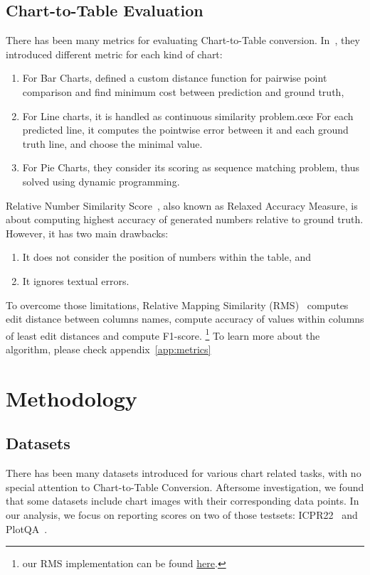 \documentclass[
	letterpaper, %
]{jdf}
\begin{document}
\subsection{Chart-to-Table Evaluation}\label{ssect:task-evaluation}
There has been many metrics for evaluating Chart-to-Table conversion.
In~\cite{luo2021chartocr}, they introduced different metric for each kind of chart:
\begin{enumerate}
         \item For Bar Charts, defined a custom distance function for pairwise point comparison and find minimum cost between prediction and ground truth,
         \item For Line charts, it is handled as continuous similarity problem.œœ
             For each predicted line, it computes the pointwise error between it and each ground truth line, and choose the minimal value.
         \item For Pie Charts, they consider its scoring as sequence matching problem, thus solved using dynamic programming.
              \end{enumerate}
Relative Number Similarity Score~\cite{masry2022chartqa}, also known as Relaxed Accuracy Measure, is about  computing highest accuracy of generated numbers relative to ground truth.
However, it has two main drawbacks:
\begin{enumerate}
         \item It does not consider the position of numbers within the table, and
         \item It ignores textual errors.
              \end{enumerate}
To overcome those limitations, Relative Mapping Similarity (RMS)~\cite{liu2022deplot} computes edit distance between columns names, compute accuracy of values within columns of least edit distances and compute F1-score.
\footnote{our RMS implementation can be found \href{https://github.gatech.edu/mfayed8/GIE-metrics}{here}.}
To learn more about the algorithm, please check appendix~\ref{app:metrics}

\section{Methodology}\label{sect:methodology}
\subsection{Datasets}\label{ssect:datasets}
There has been many datasets introduced for various chart related tasks, with no special attention to Chart-to-Table Conversion.
Aftersome investigation, we found that some datasets include chart images with their corresponding data points.
In our analysis, we focus on reporting scores on two of those testsets: ICPR22~\cite{rousseau2023pattern} and PlotQA~\cite{methani2020plotqa}.
\end{document}
